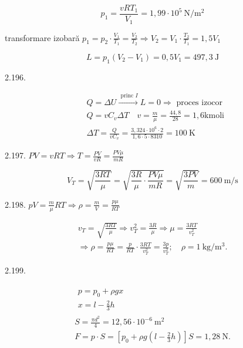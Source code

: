 \documentclass[10pt]{article}
\begin{document}
$$
p_{1}=\frac{v R T_{1}}{V_{1}}=1,99 \cdot 10^{5} \mathrm{~N} / \mathrm{m}^{2}
$$

transformare izobară $p_{1}=p_{2} \cdot \frac{V_{1}}{T_{1}}=\frac{V_{2}}{T_{2}} \Rightarrow V_{2}=V_{1} \cdot \frac{T_{2}}{T_{1}}=1,5 V_{1}$

$$
L=p_{1}\left(V_{2}-V_{1}\right)=0,5 V_{1}=497,3 \mathrm{~J}
$$

2.196.

$$
\begin{aligned}
& Q=\Delta U \xrightarrow{\text { princ } I} L=0 \Rightarrow \text { proces izocor } \\
& Q=v C_{v} \Delta T \quad v=\frac{m}{\mu}=\frac{44,8}{28}=1,6 \mathrm{kmoli} \\
& \Delta T=\frac{Q}{v C_{v}}=\frac{3,324 \cdot 10^{6} \cdot 2}{1,6 \cdot 5 \cdot 8310}=100 \mathrm{~K}
\end{aligned}
$$

2.197. $P V=v R T \Rightarrow T=\frac{P V}{v R}=\frac{P V \mu}{m R}$

$$
V_{T}=\sqrt{\frac{3 R T}{\mu}}=\sqrt{\frac{3 R}{\mu} \cdot \frac{P V \mu}{m R}}=\sqrt{\frac{3 P V}{m}}=600 \mathrm{~m} / \mathrm{s}
$$

2.198. $p V=\frac{m}{\mu} R T \Rightarrow \rho=\frac{m}{V}=\frac{p \mu}{R T}$

$$
\begin{gathered}
v_{T}=\sqrt{\frac{3 R T}{\mu}} \Rightarrow v_{T}^{2}=\frac{3 R}{\mu} \Rightarrow \mu=\frac{3 R T}{v_{T}^{2}} \\
\Rightarrow \rho=\frac{p \mu}{R T}=\frac{p}{R T} \cdot \frac{3 R T}{v_{T}^{2}}=\frac{3 p}{v_{T}^{2}} ; \quad \rho=1 \mathrm{~kg} / \mathrm{m}^{3} .
\end{gathered}
$$

2.199.

$$
\begin{gathered}
\begin{array}{c}
p=p_{0}+\rho g x \\
x=l-\frac{2}{3} h
\end{array} \\
S=\frac{\pi d^{2}}{4}=12,56 \cdot 10^{-6} \mathrm{~m}^{2} \\
F=p \cdot S=\left[p_{0}+\rho g\left(l-\frac{2}{3} h\right)\right] S=1,28 \mathrm{~N} .
\end{gathered}
$$
\end{document}
